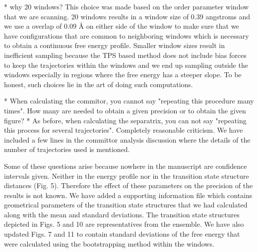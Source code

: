 \documentclass[journal=jpcbfk,manuscript=article,layout=traditional]{achemso}
\begin{document}
{\begin{response}
{* why 20 windows?}
This choice was made based on the order parameter window that we are scanning. 
20 windows results in a window size of 0.39 angstroms and we use a overlap of 
0.09 {\AA} on either side of the window to make sure that we have configurations 
that are common to neighboring windows which is necessary to obtain a continuous free energy 
profile. Smaller window sizes result in inefficient sampling because the TPS based method 
does not include bias forces to keep the trajectories within the windows and we end up 
sampling outside the windows especially in regions where the free energy has a steeper slope. 
To be honest, such choices lie in the art of doing such computations. 
\end{response}

\begin{response}
{* When calculating the commitor, you cannot say "repeating this procedure many times". 
How many are needed to obtain a given precision or to obtain the given figure?
\newline
* As before, when calculating the separatrix, you can not say "repeating this 
process for several trajectories".}
Completely reasonable criticism. We have included a few lines in the committor 
analysis discussion where the details of the number of trajectories used is mentioned. 
\end{response}

\begin{response}{Some of these questions arise because nowhere in 
the manuscript are confidence intervals given. Neither in the energy 
profile nor in the transition state structure distances (Fig. 5). 
Therefore the effect of these parameters on the precision of the 
results is not known.
}
We have added a supporting information file which contains geometrical 
parameters of the transition state structures that we had calculated 
along with the mean and standard deviations. 
The transition state structures depicted in Figs. 5 and 10 are 
representatives from the ensemble. We have also updated Figs. 7 
and 11 to contain standard deviations of the free energy that were 
calculated using the bootstrapping method within the windows. 
\end{response}

}
\end{document}
